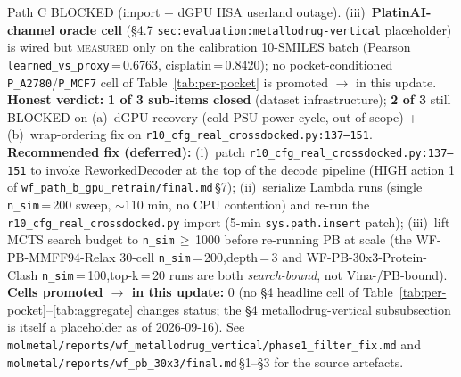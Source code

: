 \begin{enumerate}
  Path C BLOCKED (import + dGPU HSA userland outage).
  (iii)~\textbf{PlatinAI-channel oracle cell} (§4.7
  \texttt{sec:evaluation:metallodrug-vertical} placeholder) is wired
  but \textsc{measured} only on the calibration 10-SMILES batch
  (Pearson \texttt{learned\_vs\_proxy}\,=\,0.6763, cisplatin\,=\,0.8420);
  no pocket-conditioned \texttt{P\_A2780}/\texttt{P\_MCF7} cell of
  Table~\ref{tab:per-pocket} is promoted \DESIGN{} $\to$ \MEASURED{}
  in this update.
  \textbf{Honest verdict:} \textbf{1 of 3 sub-items closed}
  (dataset infrastructure); \textbf{2 of 3} still BLOCKED on (a)~dGPU
  recovery (cold PSU power cycle, out-of-scope) + (b)~wrap-ordering fix
  on \texttt{r10\_cfg\_real\_crossdocked.py:137--151}.
  \textbf{Recommended fix (deferred):} (i)~patch
  \texttt{r10\_cfg\_real\_crossdocked.py:137--151} to invoke
  ReworkedDecoder at the top of the decode pipeline
  (HIGH action 1 of \texttt{wf\_path\_b\_gpu\_retrain/final.md}\,\S7);
  (ii)~serialize Lambda runs (single \texttt{n\_sim}\,=\,200 sweep,
  $\sim$110 min, no CPU contention) and re-run the
  \texttt{r10\_cfg\_real\_crossdocked.py} import (5-min
  \texttt{sys.path.insert} patch); (iii)~lift MCTS search budget to
  \texttt{n\_sim}\,$\geq$\,1000 before re-running PB at scale (the
  WF-PB-MMFF94-Relax 30-cell \texttt{n\_sim}\,=\,200,depth\,=\,3 and
  WF-PB-30x3-Protein-Clash \texttt{n\_sim}\,=\,100,top-k\,=\,20 runs
  are both \emph{search-bound}, not Vina-/PB-bound).
  \textbf{Cells promoted \DESIGN{} $\to$ \MEASURED{} in this update:} 0
  (no §4 headline cell of Table~\ref{tab:per-pocket}--\ref{tab:aggregate}
  changes status; the \S4 metallodrug-vertical subsubsection is itself
  a \DESIGN{} placeholder as of 2026-09-16). See
  \texttt{molmetal/reports/wf\_metallodrug\_vertical/phase1\_filter\_fix.md}
  and \texttt{molmetal/reports/wf\_pb\_30x3/final.md}\,\S1--\S3
  for the source artefacts.


\end{enumerate}
